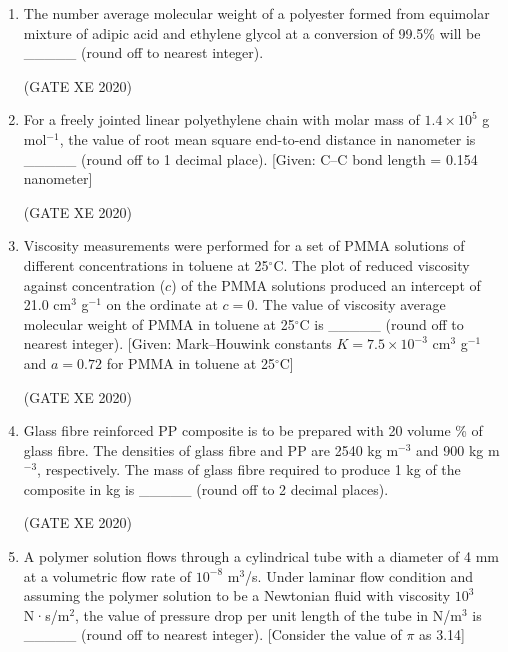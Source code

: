 \documentclass[12pt]{article}
\begin{document}
\begin{enumerate}
\begin{enumerate}
\item P-Dilatant, Q-Bingham plastic, R-Pseudoplastic, S-Newtonian  
\item P-Bingham plastic, Q-Pseudoplastic, R-Dilatant, S-Newtonian  
\item P-Pseudoplastic, Q-Bingham plastic, R-Newtonian, S-Dilatant  
\item P-Newtonian, Q-Dilatant, R-Pseudoplastic, S-Bingham plastic  
\end{enumerate}

(GATE XE 2020)

\item The number average molecular weight of a polyester formed from equimolar mixture of adipic acid and ethylene glycol at a conversion of 99.5\% will be \_\_\_\_\_ (round off to nearest integer).  

(GATE XE 2020)

\item For a freely jointed linear polyethylene chain with molar mass of $1.4\times 10^{5}$ g mol$^{-1}$, the value of root mean square end-to-end distance in nanometer is \_\_\_\_\_ (round off to 1 decimal place). [Given: C–C bond length = 0.154 nanometer]  

(GATE XE 2020)

\item Viscosity measurements were performed for a set of PMMA solutions of different concentrations in toluene at 25$^\circ$C. The plot of reduced viscosity against concentration ($c$) of the PMMA solutions produced an intercept of 21.0 cm$^3$ g$^{-1}$ on the ordinate at $c=0$. The value of viscosity average molecular weight of PMMA in toluene at 25$^\circ$C is \_\_\_\_\_ (round off to nearest integer). [Given: Mark–Houwink constants $K=7.5\times10^{-3}$ cm$^3$ g$^{-1}$ and $a=0.72$ for PMMA in toluene at 25$^\circ$C]  

(GATE XE 2020)

\item Glass fibre reinforced PP composite is to be prepared with 20 volume \% of glass fibre. The densities of glass fibre and PP are 2540 kg m$^{-3}$ and 900 kg m$^{-3}$, respectively. The mass of glass fibre required to produce 1 kg of the composite in kg is \_\_\_\_\_ (round off to 2 decimal places).  

(GATE XE 2020)

\item A polymer solution flows through a cylindrical tube with a diameter of 4 mm at a volumetric flow rate of $10^{-8}$ m$^3$/s. Under laminar flow condition and assuming the polymer solution to be a Newtonian fluid with viscosity $10^3$ N·s/m$^2$, the value of pressure drop per unit length of the tube in N/m$^3$ is \_\_\_\_\_ (round off to nearest integer). [Consider the value of $\pi$ as 3.14]  


\end{enumerate}
\end{document}
